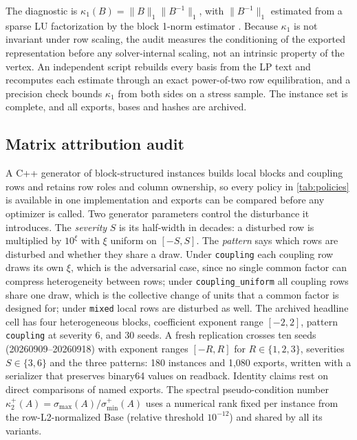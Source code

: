 \documentclass[smallextended,envcountsect,envcountsame]{svjour3}
\begin{document}
The diagnostic is $\kappa_1(B)=\|B\|_1\|B^{-1}\|_1$, with $\|B^{-1}\|_1$ estimated from a
sparse LU factorization by the block 1-norm estimator \cite{higham2000norm}. Because $\kappa_1$
is not invariant under row scaling, the audit measures the conditioning of the exported
representation before any solver-internal scaling, not an intrinsic property of the vertex. An
independent script rebuilds every basis from the LP text and recomputes each estimate through
an exact power-of-two row equilibration, and a precision check bounds $\kappa_1$ from both sides
on a stress sample. The instance set is complete, and all exports, bases
and hashes are archived.

\subsection{Matrix attribution audit}
\label{subsec:design-matrix}
A C++ generator of block-structured instances builds local blocks and coupling rows and
retains row roles and column ownership, so every policy in \cref{tab:policies} is available in
one implementation and exports can be compared before any optimizer is called. Two generator
parameters control the disturbance it introduces. The \emph{severity} $S$ is its half-width in
decades: a disturbed row is multiplied by $10^{\xi}$ with $\xi$ uniform on $[-S,S]$. The
\emph{pattern} says which rows are disturbed and whether they share a draw. Under
\texttt{coupling} each coupling row draws its own $\xi$, which is the adversarial case, since
no single common factor can compress heterogeneity between rows; under
\texttt{coupling\_uniform} all coupling rows share one draw, which is the collective change of
units that a common factor is designed for; under \texttt{mixed} local rows are disturbed as
well. The archived headline cell has four heterogeneous blocks, coefficient exponent range
$[-2,2]$, pattern \texttt{coupling} at severity 6, and 30 seeds. A fresh replication crosses
ten seeds (20260909--20260918) with exponent ranges $[-R,R]$ for $R\in\{1,2,3\}$, severities
$S\in\{3,6\}$ and the three patterns: 180 instances and 1,080 exports, written with a
serializer that preserves binary64 values on readback. Identity claims rest on direct comparisons of named
exports. The spectral pseudo-condition number
$\kappa_2^+(A)=\sigma_{\max}(A)/\sigma_{\min}^+(A)$ uses a numerical rank fixed per instance from
the row-L2-normalized Base (relative threshold $10^{-12}$) and shared by all its variants.
\end{document}
